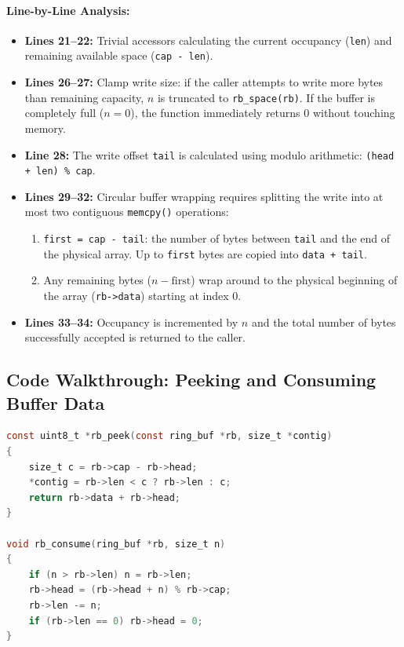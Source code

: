\paragraph{Line-by-Line Analysis:}
\begin{itemize}[leftmargin=1.5em]
    \item \textbf{Lines 21--22:} Trivial accessors calculating the current occupancy (\texttt{len}) and remaining available space (\texttt{cap - len}).
    \item \textbf{Lines 26--27:} Clamp write size: if the caller attempts to write more bytes than remaining capacity, $n$ is truncated to \texttt{rb\_space(rb)}. If the buffer is completely full ($n = 0$), the function immediately returns 0 without touching memory.
    \item \textbf{Line 28:} The write offset \texttt{tail} is calculated using modulo arithmetic: \texttt{(head + len) \% cap}.
    \item \textbf{Lines 29--32:} Circular buffer wrapping requires splitting the write into at most two contiguous \texttt{memcpy()} operations:
    \begin{enumerate}
        \item \texttt{first = cap - tail}: the number of bytes between \texttt{tail} and the end of the physical array. Up to \texttt{first} bytes are copied into \texttt{data + tail}.
        \item Any remaining bytes ($n - \text{first}$) wrap around to the physical beginning of the array (\texttt{rb->data}) starting at index 0.
    \end{enumerate}
    \item \textbf{Lines 33--34:} Occupancy is incremented by $n$ and the total number of bytes successfully accepted is returned to the caller.
\end{itemize}

\subsection{Code Walkthrough: Peeking and Consuming Buffer Data}

\begin{lstlisting}[language=C]
const uint8_t *rb_peek(const ring_buf *rb, size_t *contig)
{
    size_t c = rb->cap - rb->head;
    *contig = rb->len < c ? rb->len : c;
    return rb->data + rb->head;
}

void rb_consume(ring_buf *rb, size_t n)
{
    if (n > rb->len) n = rb->len;
    rb->head = (rb->head + n) % rb->cap;
    rb->len -= n;
    if (rb->len == 0) rb->head = 0;
}
\end{lstlisting}

